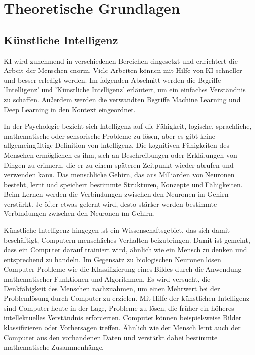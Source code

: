 \chapter{Theoretische Grundlagen}
\section{Künstliche Intelligenz}
\ac{KI} wird zunehmend in verschiedenen Bereichen eingesetzt und erleichtert die Arbeit der Menschen enorm. Viele Arbeiten können mit Hilfe von \ac{KI} schneller und besser erledigt werden. Im folgenden Abschnitt werden die Begriffe 'Intelligenz' und 'Künstliche Intelligenz' erläutert, um ein einfaches Verständnis zu schaffen. Außerdem werden die verwandten Begriffe Machine Learning und Deep Learning in den Kontext eingeordnet.

In der Psychologie bezieht sich Intelligenz auf die Fähigkeit, logische, sprachliche, mathematische oder sensorische Probleme zu lösen, aber es gibt keine allgemeingültige Definition von Intelligenz. Die kognitiven Fähigkeiten des Menschen ermöglichen es ihm, sich an Beschreibungen oder Erklärungen von Dingen zu erinnern, die er zu einem späteren Zeitpunkt wieder abrufen und verwenden kann. Das menschliche Gehirn, das aus Milliarden von Neuronen besteht, lernt und speichert bestimmte Strukturen, Konzepte und Fähigkeiten. Beim Lernen werden die Verbindungen zwischen den Neuronen im Gehirn verstärkt. Je öfter etwas gelernt wird, desto stärker werden bestimmte Verbindungen zwischen den Neuronen im Gehirn. \cite[vgl.][]{Ertel2021,Posthoff2022}

Künstliche Intelligenz hingegen ist ein Wissenschaftsgebiet, das sich damit beschäftigt, Computern menschliches Verhalten beizubringen. Damit ist gemeint, dass ein Computer darauf trainiert wird, ähnlich wie ein Mensch zu denken und entsprechend zu handeln. \cite[vgl.][]{Lang2023} Im Gegensatz zu biologischen Neuronen lösen Computer Probleme wie die Klassifizierung eines Bildes durch die Anwendung mathematischer Funktionen und Algorithmen. Es wird versucht, die Denkfähigkeit des Menschen nachzuahmen, um einen Mehrwert bei der Problemlösung durch Computer zu erzielen. Mit Hilfe der künstlichen Intelligenz sind Computer heute in der Lage, Probleme zu lösen, die früher ein höheres intellektuelles Verständnis erforderten. Computer können beispielsweise Bilder klassifizieren oder Vorhersagen treffen. Ähnlich wie der Mensch lernt auch der Computer aus den vorhandenen Daten und verstärkt dabei bestimmte mathematische Zusammenhänge. \cite[vgl.][]{WasIstKi}

